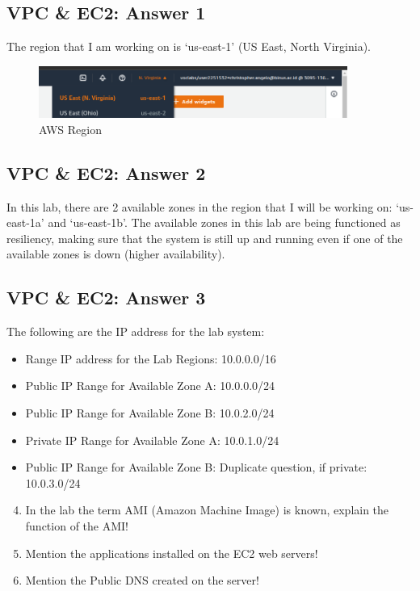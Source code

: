 \documentclass[
  11pt, %
]{assignment}
\begin{document}
\subsection*{VPC \& EC2: Answer 1}

The region that I am working on is `us-east-1' (US East, North Virginia).

\begin{figure}[H]
	\centering
	\includegraphics[width=0.9\textwidth]{graphics/section4/Zone.png}
	\caption{AWS Region}\label{fig:vpcregion}
\end{figure}

\subsection*{VPC \& EC2: Answer 2}

In this lab, there are 2 available zones in the region that I will be working on: `us-east-1a' and `us-east-1b'. The available zones in this lab are being functioned as resiliency, making sure that the system is still up and running even if one of the available zones is down (higher availability).

\subsection*{VPC \& EC2: Answer 3}

The following are the IP address for the lab system:

\begin{itemize}
	\item Range IP address for the Lab Regions: 10.0.0.0/16
	\item Public IP Range for Available Zone A\@: 10.0.0.0/24
	\item Public IP Range for Available Zone B\@: 10.0.2.0/24
	\item Private IP Range for Available Zone A\@: 10.0.1.0/24
	\item Public IP Range for Available Zone B\@: Duplicate question, if private: 10.0.3.0/24
\end{itemize}

\pagebreak

\begin{problem}
\begin{enumerate}
	\setcounter{enumi}{3}
	\item In the lab the term AMI (Amazon Machine Image) is known, explain the function of the AMI\@!
	\item Mention the applications installed on the EC2 web servers!
	\item Mention the Public DNS created on the server!
\end{enumerate}
\end{problem}
\end{document}

